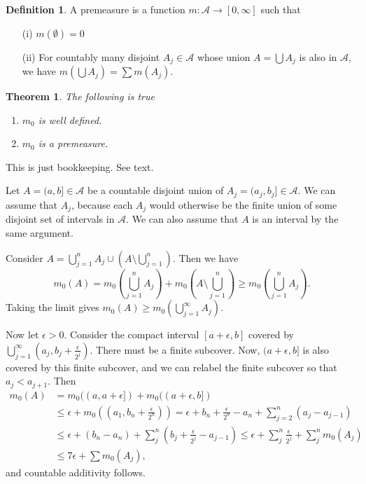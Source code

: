 \documentclass[11pt]{article}
\newtheorem{thm}{Theorem}[section]
\theoremstyle{definition}
\newtheorem{defn}{Definition}[section]
\newcommand{\sm}[0]{\setminus}
\newcommand{\m}[1]{\mathcal{#1}}
\begin{document}
\begin{defn}
    A premeasure is a function $m:\m{A}\to[0,\infty]$ such that
    \begin{enumerate}
        \item[(i)] $m(\emptyset) = 0$
        \item[(ii)] For countably many disjoint $A_j\in\m{A}$ whose union
            $A=\bigcup A_j$ is also in $\m{A}$, we have
            $m(\bigcup{A_j})=\sum{m(A_j)}$.
    \end{enumerate}
\end{defn}

\begin{thm}
    The following is true
    \begin{enumerate}
        \item $m_0$ is well defined.
        \item $m_0$ is a premeasure.
    \end{enumerate}
\end{thm}

\proof[Proof of 1.]
This is just bookkeeping. See text.
\qedhere

\proof[Proof of 2.]
Let $A=(a,b]\in\m{A}$ be a countable disjoint union of $A_j=(a_j,b_j]\in\m{A}$. We can
assume that $A_j$, because each $A_j$ would otherwise be the finite union of some disjoint
set of intervals in $\m{A}$. We can also assume that $A$ is an interval by the same
argument. 

Consider $A = \bigcup_{j=1}^n A_j \cup (A\sm\bigcup_{j=1}^n)$. Then we have 
\[
    m_0(A) = m_0\left(\bigcup_{j=1}^n A_j\right) + m_0\left(A\sm\bigcup_{j=1}^n\right)
    \ge m_0\left(\bigcup_{j=1}^n A_j\right) .
\]
Taking the limit gives $m_0(A) \ge m_0(\bigcup_{j=1}^\infty A_j)$.

Now let $\epsilon > 0$. Consider the compact interval $[a+\epsilon,b]$ covered by
$\bigcup_{j=1}^\infty (a_j, b_j+\frac{\epsilon}{2^j})$. There must be a finite subcover.
Now, $(a+\epsilon,b]$ is also covered by this finite subcover, and we can relabel the
finite subcover so that $a_j<a_{j+1}$. Then 
\begin{align*}
    m_0(A) &= m_0((a,a+\epsilon]) + m_0((a+\epsilon,b]) \\
            &\le \epsilon + m_0((a_1,b_n+\frac{\epsilon}{2^n}))
            = \epsilon + b_n+\frac{\epsilon}{2^n} - a_n + \sum_{j=2}^n(a_j-a_{j-1}) \\
            &\le \epsilon + (b_n-a_n) + \sum_j^n\left(b_j+\frac{\epsilon}{2^j}-a_{j-1}\right)
            \le \epsilon + \sum_j^n\frac{\epsilon}{2^j} + \sum_j^n m_0(A_j) \\
            &\le 7\epsilon + \sum m_0(A_j) ,
\end{align*}
and countable additivity follows.
\qedhere
\end{document}
